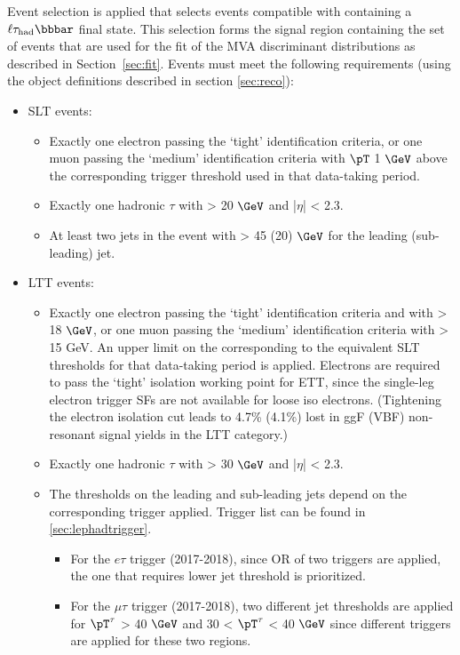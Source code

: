 Event selection is applied that selects events compatible with containing a $\ell\tau_{\mathrm{had}}\bbbar$ final state. This selection forms the signal region containing the set of events that are used for the fit of the MVA discriminant distributions as described in Section~\ref{sec:fit}. Events must meet the following requirements
(using the object definitions described in section \ref{sec:reco}):
\begin{itemize}
\item SLT events:
	\begin{itemize}
		\item Exactly one electron passing the `tight' identification criteria, or one muon passing the `medium' identification criteria 
		with $\pT$ 1 $\GeV$ above the corresponding trigger threshold used in that data-taking period.
		\item Exactly one hadronic $\tau$ with \pT > 20 $\GeV$ and |$\eta$| < 2.3.
		\item At least two jets in the event with \pT > 45 (20) $\GeV$ for the leading (sub-leading) jet.
	\end{itemize}
\item LTT events:
	\begin{itemize}
		\item Exactly one electron passing the `tight' identification criteria and with \pT > 18 $\GeV$, or one
 		muon passing the `medium' identification criteria with \pT > 15 GeV. 
		An upper limit on the \pT corresponding to the equivalent SLT thresholds for that data-taking period is applied.
		Electrons are required to pass the `tight' isolation working point for ETT, 
		since the single-leg electron trigger SFs are not available for loose iso electrons.  
		(Tightening the electron isolation cut leads to 4.7\% (4.1\%) lost in ggF (VBF) non-resonant signal yields in the LTT category.) 
		\item Exactly one hadronic $\tau$ with \pT > 30 $\GeV$ and |$\eta$| < 2.3.
		\item The \pT thresholds on the leading and sub-leading jets depend on the 
		corresponding trigger applied. Trigger list can be found in \ref{sec:lephadtrigger}.
		\begin{itemize}
			\item For the $e\tau$ trigger (2017-2018), since OR of two triggers are applied, the one that requires lower jet \pT threshold is prioritized.
			\item For the $\mu\tau$ trigger (2017-2018), two different jet \pT thresholds are applied for $\pT^{\tau}$ > 40 $\GeV$ and 30 < $\pT^{\tau}$ < 40 $\GeV$ since different triggers are applied for these two regions.

\end{itemize}
\end{itemize}
\end{itemize}
